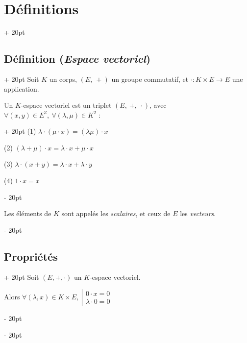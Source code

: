 \documentclass[a4paper, 12pt, twoside]{article}
\newcommand{\ind}[1][20pt]{\advance\leftskip + #1}
\newcommand{\deind}[1][20pt]{\advance\leftskip - #1}
\newenvironment{indt}[2][20pt]{#2 \par \ind[#1]}{\par \deind} %
\begin{document}
    \begin{indt}{\section{Définitions}}
        
        \begin{indt}{\subsection{Définition (\textit{Espace vectoriel})}}
            Soit $K$ un corps, $(E,\ +)$ un groupe commutatif, et $\cdot : K \times E \longrightarrow E$ une application.
            
            \vspace{6pt}
            
            \begin{indt}{Un $K$-espace vectoriel est un triplet $(E,\ +,\ \cdot)$, avec $\forall (x, y) \in E^2,\ \forall (\lambda, \mu) \in K^2$ :}
                (1) $\lambda \cdot (\mu \cdot x) = (\lambda \mu) \cdot x$
                
                (2) $(\lambda + \mu) \cdot x = \lambda \cdot x + \mu \cdot x$
                
                (3) $\lambda \cdot (x + y) = \lambda \cdot x + \lambda \cdot y$
                
                (4) $1 \cdot x = x$
            \end{indt}
            
            \vspace{12pt}
            
            Les éléments de $K$ sont appelés les \textit{scalaires}, et ceux de $E$ les \textit{vecteurs}.
        \end{indt}
        
        \vspace{12pt}
        
        \begin{indt}{\subsection{Propriétés}}
            Soit $(E, +, \cdot)$ un $K$-espace vectoriel.
            
            Alors
            $
                \forall (\lambda, x) \in K \times E,\
                \left|
                \begin{array}{l}
                    0 \cdot x = 0
                    \\
                    \lambda \cdot 0 = 0
                \end{array}
                \right.
            $
            

\end{indt}
\end{indt}
\end{document}
